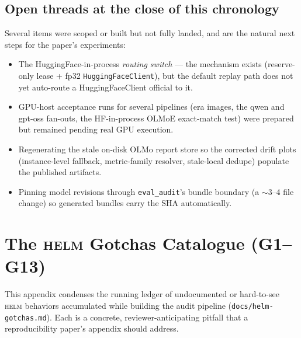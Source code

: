 \documentclass[11pt]{report}
\newcommand{\code}[1]{\texttt{#1}}
\newcommand{\file}[1]{\texttt{#1}}
\begin{document}
\section{Open threads at the close of this chronology}

Several items were scoped or built but not fully landed, and are the natural
next steps for the paper's experiments:

\begin{itemize}[nosep]
  \item The HuggingFace-in-process \emph{routing switch} --- the mechanism exists
        (reserve-only lease + fp32 \code{HuggingFaceClient}), but the default replay
        path does not yet auto-route a HuggingFaceClient official to it.
  \item GPU-host acceptance runs for several pipelines (era images, the qwen and
        gpt-oss fan-outs, the HF-in-process OLMoE exact-match test) were prepared but
        remained pending real GPU execution.
  \item Regenerating the stale on-disk OLMo report store so the corrected drift
        plots (instance-level fallback, metric-family resolver, stale-local dedupe)
        populate the published artifacts.
  \item Pinning model revisions through \code{eval\_audit}'s bundle boundary (a
        $\sim$3--4 file change) so generated bundles carry the SHA automatically.
\end{itemize}

\appendix
\chapter{The \textsc{helm} Gotchas Catalogue (G1--G13)}
\label{app:gotchas}

This appendix condenses the running ledger of undocumented or hard-to-see
\textsc{helm} behaviors accumulated while building the audit pipeline
(\file{docs/helm-gotchas.md}). Each is a concrete, reviewer-anticipating pitfall
that a reproducibility paper's appendix should address.
\end{document}
